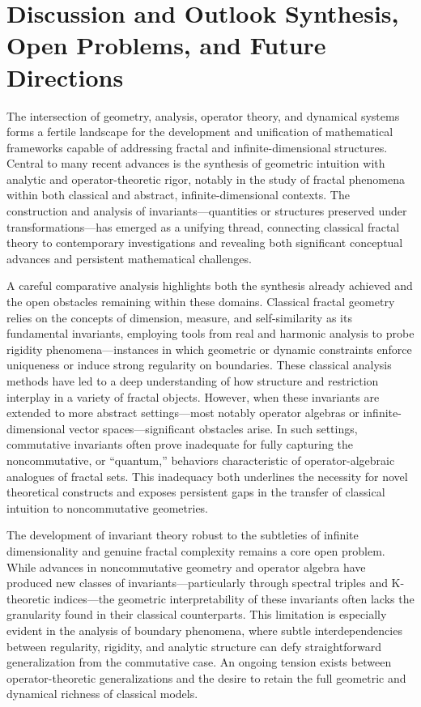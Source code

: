 \section{Discussion and Outlook Synthesis, Open Problems, and Future Directions}

The intersection of geometry, analysis, operator theory, and dynamical systems forms a fertile landscape for the development and unification of mathematical frameworks capable of addressing fractal and infinite-dimensional structures. Central to many recent advances is the synthesis of geometric intuition with analytic and operator-theoretic rigor, notably in the study of fractal phenomena within both classical and abstract, infinite-dimensional contexts. The construction and analysis of invariants—quantities or structures preserved under transformations—has emerged as a unifying thread, connecting classical fractal theory to contemporary investigations and revealing both significant conceptual advances and persistent mathematical challenges.

A careful comparative analysis highlights both the synthesis already achieved and the open obstacles remaining within these domains. Classical fractal geometry relies on the concepts of dimension, measure, and self-similarity as its fundamental invariants, employing tools from real and harmonic analysis to probe rigidity phenomena—instances in which geometric or dynamic constraints enforce uniqueness or induce strong regularity on boundaries. These classical analysis methods have led to a deep understanding of how structure and restriction interplay in a variety of fractal objects. However, when these invariants are extended to more abstract settings—most notably operator algebras or infinite-dimensional vector spaces—significant obstacles arise. In such settings, commutative invariants often prove inadequate for fully capturing the noncommutative, or ``quantum,'' behaviors characteristic of operator-algebraic analogues of fractal sets. This inadequacy both underlines the necessity for novel theoretical constructs and exposes persistent gaps in the transfer of classical intuition to noncommutative geometries.

The development of invariant theory robust to the subtleties of infinite dimensionality and genuine fractal complexity remains a core open problem. While advances in noncommutative geometry and operator algebra have produced new classes of invariants—particularly through spectral triples and K-theoretic indices—the geometric interpretability of these invariants often lacks the granularity found in their classical counterparts. This limitation is especially evident in the analysis of boundary phenomena, where subtle interdependencies between regularity, rigidity, and analytic structure can defy straightforward generalization from the commutative case. An ongoing tension exists between operator-theoretic generalizations and the desire to retain the full geometric and dynamical richness of classical models.

